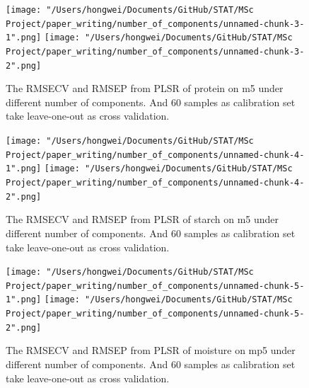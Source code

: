 \documentclass[a4paper,12pt,titlepage]{article} %
\numberwithin{equation}{section}  %
\begin{document}
\begin{appendices}
	
	\begin{figure}[h]    %
		\centering           %
		\texttt{[image: "/Users/hongwei/Documents/GitHub/STAT/MSc Project/paper\_writing/number\_of\_components/unnamed-chunk-3-1".png]}  %
		\texttt{[image: "/Users/hongwei/Documents/GitHub/STAT/MSc Project/paper\_writing/number\_of\_components/unnamed-chunk-3-2".png]}  %
		\caption{The RMSECV and RMSEP from PLSR of protein on m5 under different number of components. And 60 samples as calibration set take leave-one-out as cross validation.}          %
		\label{fig:components_3-1}               %
	\end{figure}                        %
	
	
	
	\begin{figure}[h]    %
		\centering           %
		\texttt{[image: "/Users/hongwei/Documents/GitHub/STAT/MSc Project/paper\_writing/number\_of\_components/unnamed-chunk-4-1".png]}  %
		\texttt{[image: "/Users/hongwei/Documents/GitHub/STAT/MSc Project/paper\_writing/number\_of\_components/unnamed-chunk-4-2".png]}  %
		\caption{The RMSECV and RMSEP from PLSR of starch on m5 under different number of components. And 60 samples as calibration set take leave-one-out as cross validation.}          %
		\label{fig:components_4-1}               %
	\end{figure}                        %
	
	
	
	\begin{figure}[h]    %
		\centering           %
		\texttt{[image: "/Users/hongwei/Documents/GitHub/STAT/MSc Project/paper\_writing/number\_of\_components/unnamed-chunk-5-1".png]}  %
		\texttt{[image: "/Users/hongwei/Documents/GitHub/STAT/MSc Project/paper\_writing/number\_of\_components/unnamed-chunk-5-2".png]}  %
		\caption{The RMSECV and RMSEP from PLSR of moisture on mp5 under different number of components. And 60 samples as calibration set take leave-one-out as cross validation.}          %
		\label{fig:components_5-1}               %
	\end{figure}                        %
	

\end{appendices}
\end{document}
